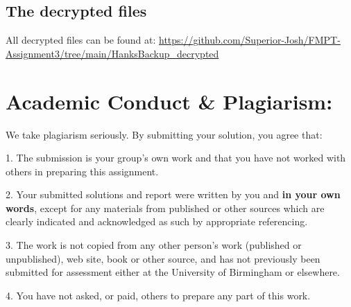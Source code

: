 \documentclass[11pt]{article}
\begin{document}
\subsection{The decrypted files}
All decrypted files can be found at: \url{https://github.com/Superior-Josh/FMPT-Assignment3/tree/main/HanksBackup_decrypted}


\newpage
\section*{Academic Conduct \& Plagiarism:}
We take plagiarism seriously. By submitting your solution, you agree that:

1. The submission is your group's own work and that you have not worked with others in preparing this assignment.

2. Your submitted solutions and report were written by you and \textbf{in your own words}, except for any materials from published or other sources which are clearly indicated and acknowledged as such by appropriate referencing.

3. The work is not copied from any other person's work (published or unpublished), web site, book or other source, and has not previously been submitted for assessment either at the University of Birmingham or elsewhere.

4. You have not asked, or paid, others to prepare any part of this work.
\end{document}
